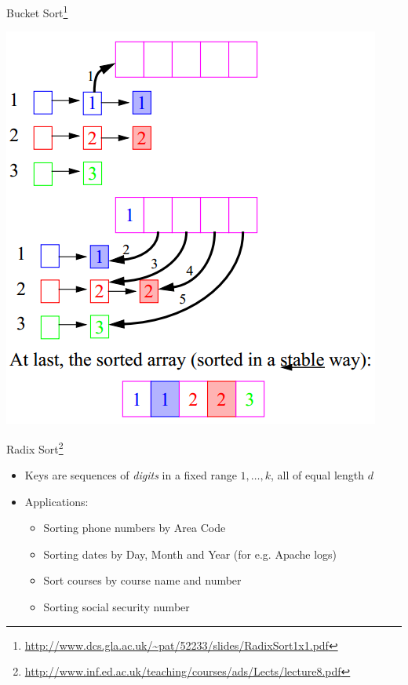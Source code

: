 \documentclass{beamer}
\begin{document}
\begin{frame}{Bucket Sort\footnote{\url{http://www.dcs.gla.ac.uk/~pat/52233/slides/RadixSort1x1.pdf}}}
\begin{center}
    \includegraphics[scale=0.4]{bucketSortEg2.png}
\end{center}
\end{frame}


\begin{frame}{Radix Sort\footnote{\url{http://www.inf.ed.ac.uk/teaching/courses/ads/Lects/lecture8.pdf}}}
\begin{itemize}
\item Keys are sequences of {\em digits} in a fixed range $1, \ldots, k$, all of equal length $d$ 
\item Applications:
\begin{itemize}
    \item Sorting phone numbers by Area Code
    \item Sorting dates by Day, Month and Year (for e.g. Apache logs)
    \item Sort courses by course name and number
    \item Sorting social security number
\end{itemize}
\end{itemize}
\end{frame}
\end{document}
